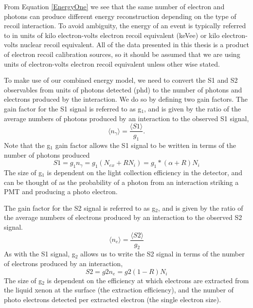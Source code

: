 \documentclass[a4paper,12pt]{article}
\begin{document}
{From Equation \ref{EnergyOne} we see that the same number of electron and photons can produce different energy reconstruction depending on the type of recoil interaction.  To avoid ambiguity, the energy of an event is typically referred to in units of kilo electron-volts electron recoil equivalent (keVee) or kilo electron-volts nuclear recoil equivalent.  All of the data presented in this thesis is a product of electron recoil calibration sources, so it should be assumed that we are using units of electron-volts electron recoil equivalent unless other wise stated.

To make use of our combined energy model, we need to convert the S1 and S2 observables from units of photons detected (phd) to the number of photons and electrons produced by the interaction.  We do so by defining two gain factors.  The gain factor for the S1 signal is referred to as g$_1$, and is given by the ratio of the average numbers of photons produced by an interaction to the observed S1 signal,
\begin{equation}
\langle n_\gamma \rangle = \frac{ \langle S1 \rangle }{g_1}.
\end{equation}
Note that the g$_1$ gain factor allows the S1 signal to be written in terms of the number of photons produced
\begin{equation}
S1=g_1 n_\gamma = g_1 (N_{ex} + R N_i) = g_1 * (\alpha + R) N_i
\end{equation}
The size of g$_1$ is dependent on the light collection efficiency in the detector, and can be thought of as the probability of a photon from an interaction striking a PMT and producing a photo electron. 

The gain factor for the S2 signal is referred to as g$_2$, and is given by the ratio of the average numbers of electrons produced by an interaction to the observed S2 signal.  
\begin{equation}
\langle n_e \rangle = \frac{ \langle S2 \rangle }{g_2}
\end{equation}
As with the S1 signal, g$_2$ allows us to write the S2 signal in terms of the number of electrons produced by an interaction,
\begin{equation}
S2=g2 n_e=g2 (1-R) N_i
\end{equation}
The size of g$_2$ is dependent on the efficiency at which electrons are extracted from the liquid xenon at the surface (the extraction efficiency), and the number of photo electrons detected per extracted electron (the single electron size).  

}
\end{document}

